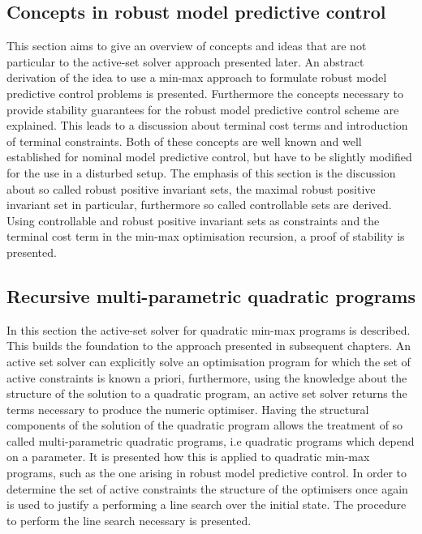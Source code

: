 \documentclass[a4paper,12pt]{scrartcl}
\begin{document}
\subsection{Concepts in robust model predictive control}\label{chap:concepts}
This section aims to give an overview of concepts and ideas that are not particular to
the active-set solver approach presented later.
%
An abstract derivation of the idea to use a min-max approach to formulate robust model predictive control
problems is presented.
%
Furthermore the concepts necessary to provide stability guarantees for the robust model predictive control
scheme are explained.
%
This leads to a discussion about terminal cost terms and introduction of terminal constraints. 
%
Both of these concepts are well known and well established for nominal model predictive control, but have to 
be slightly modified for the use in a disturbed setup. 
%
The emphasis of this section is the discussion about so called robust positive invariant sets, the maximal
robust positive invariant set in particular, furthermore so called controllable sets are derived.
%
Using controllable and robust positive invariant sets as constraints and the terminal cost term in the min-max optimisation
recursion, a proof of stability is presented.

\subsection{Recursive multi-parametric quadratic programs}\label{chap:recursive:mpqp}
In this section the active-set solver for quadratic min-max programs is described.
%
This builds the foundation to the approach presented in subsequent chapters.
%
An active set solver can explicitly solve an optimisation program for which the set of active constraints is
known a priori, furthermore, using the knowledge about the structure of the solution to a quadratic program,
an active set solver returns the terms necessary to produce the numeric optimiser.
%
Having the structural components of the solution of the quadratic program allows the treatment of so called
multi-parametric quadratic programs, i.e quadratic programs which depend on a parameter.
%
It is presented how this is applied to quadratic min-max programs, such as the one arising in robust model
predictive control.
%
In order to determine the set of active constraints the structure of the optimisers once again is used to
justify a performing a line search over the initial state.
%
The procedure to perform the line search necessary is presented.
\end{document}
